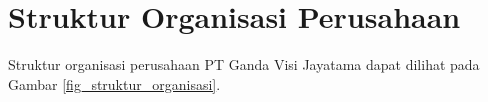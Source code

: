 \section{Struktur Organisasi Perusahaan}



Struktur organisasi perusahaan PT Ganda Visi Jayatama dapat dilihat pada Gambar \ref{fig_struktur_organisasi}.


